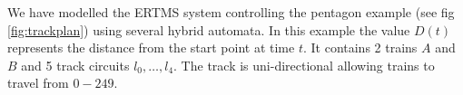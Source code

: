 We have modelled the ERTMS system controlling the pentagon example (see fig \ref{fig:trackplan}) using several hybrid automata. In this example the value $D(t)$ represents the distance from the start point at time $t$. 
It contains 2 trains $A$ and $B$ and 5 track circuits $l_0, \ldots , l_4$. The track is uni-directional allowing trains to travel from $0 - 249$. 


